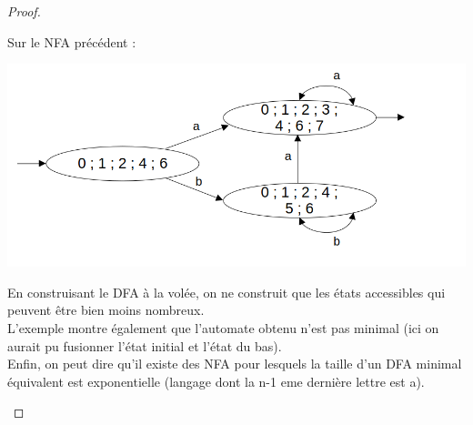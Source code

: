 \begin{proof}
\begin{enumerate}
	 \begin{example}
	Sur le NFA précédent :
	\begin{center}
		\includegraphics[scale=0.4]{Developpements/Thompson/exempledfa.png}
	\end{center}
	\end{example}

	\begin{com}
		En construisant le DFA à la volée, on ne construit que les états accessibles qui peuvent être bien moins nombreux. \\
		L'exemple montre également que l'automate obtenu n'est pas minimal (ici on aurait pu fusionner l'état initial et l'état du bas). \\
		Enfin, on peut dire qu'il existe des NFA pour lesquels la taille d'un DFA minimal équivalent est exponentielle (langage dont la n-1 eme dernière lettre est a).
	\end{com}

	\end{enumerate}
	

\end{proof}